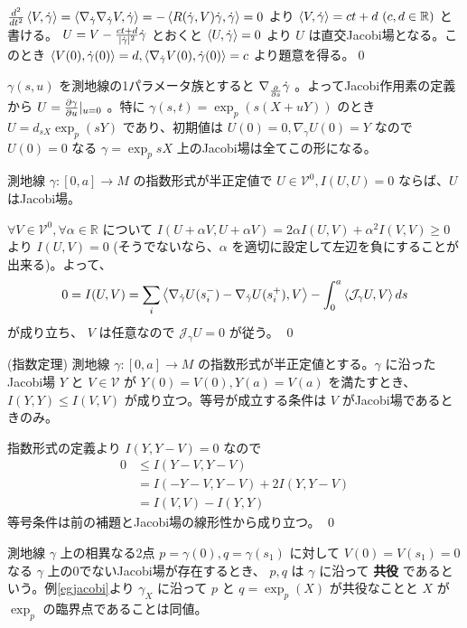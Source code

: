 \documentclass[dvipdfmx,a4paper]{jsreport}
\theoremstyle{definition}
\newcommand{\der}{\partial}
\newcommand{\R}{\mathbb{R}}
\begin{document}
\prf ${d^2 \over dt^2}\ev{V,\dot{\gamma}}=\ev{\nabla_{\dot{\gamma}}\nabla_{\dot{\gamma}}V,\dot{\gamma}}=-\ev{R(\dot{\gamma},V)\dot{\gamma},\dot{\gamma}}=0$ より $\ev{V,\dot{\gamma}}=ct+d\ (c,d \in \R)$ と書ける。 $U=V-{ct+d \over |\dot{\gamma}|^2}\dot{\gamma}$ とおくと $\ev{U,\dot{\gamma}}=0$ より $U$ は直交Jacobi場となる。このとき $\ev{V(0),\dot{\gamma}(0)}=d,\ev{\nabla_{\dot{\gamma}}V(0),\dot{\gamma}(0)}=c$ より題意を得る。\qed


\eg\label{egjacobi} $\gamma(s,u)$ を測地線の1パラメータ族とすると $\nabla_{\der \over \der s} \dot{\gamma}$ 。よってJacobi作用素の定義から $U={\der \gamma \over \der u}|_{u=0}$ 。特に $\gamma(s,t)=\exp_p (s(X+uY))$ のとき $U=d_{sX}\exp_{p}(sY)$ であり、初期値は $U(0)=0,\nabla_{\dot{\gamma}}U(0)=Y$ なので $U(0)=0$ なる $\gamma=\exp_p sX$ 上のJacobi場は全てこの形になる。

\lem\label{lemjacobi} 測地線 $\gamma:[0,a] \to M$ の指数形式が半正定値で $U \in \mathcal{V}^0,I(U,U)=0$ ならば、$U$ はJacobi場。

\prf $\forall V \in \mathcal{V}^0,\forall \alpha \in \mathbb{R}$ について $I(U+\alpha V,U+\alpha V)=2\alpha I(U,V)+\alpha^2I(V,V)\geq 0$ より $I(U,V) =0$ (そうでないなら、$\alpha$ を適切に設定して左辺を負にすることが出来る)。よって、
\begin{align*}
    0=I(U,V)=\sum_i \ev{\nabla_{\dot{\gamma}}U(s_i^-)-\nabla_{\dot{\gamma}}U(s_i^+),V}-\int_0^a \ev{\mathcal{J}_\gamma U,V} ds
\end{align*}
が成り立ち、 $V$ は任意なので $\mathcal{J}_\gamma U=0$ が従う。 \qed

\lem\label{lemindex} (指数定理) 測地線 $\gamma:[0,a] \to M$ の指数形式が半正定値とする。$\gamma$ に沿ったJacobi場 $Y$ と $V \in \mathcal{V}$ が $Y(0)=V(0),Y(a)=V(a)$ を満たすとき、$I(Y,Y) \leq I(V,V)$ が成り立つ。等号が成立する条件は $V$ がJacobi場であるときのみ。

\prf 指数形式の定義より $I(Y,Y-V)=0$ なので
\begin{align*}
    0 &\leq I(Y-V,Y-V) \\
    &=I(-Y-V,Y-V)+2I(Y,Y-V) \\
    &=I(V,V)-I(Y,Y)
\end{align*}
等号条件は前の補題とJacobi場の線形性から成り立つ。 \qed

 測地線 $\gamma$ 上の相異なる2点 $p=\gamma(0),q=\gamma(s_1)$ に対して $V(0)=V(s_1)=0$ なる $\gamma$ 上の0でないJacobi場が存在するとき、 $p,q$ は $\gamma$ に沿って \textbf{共役} であるという。例\ref{egjacobi}より $\gamma_X$ に沿って $p$ と $q=\exp_p(X)$ が共役なことと $X$ が $\exp_p$ の臨界点であることは同値。
\end{document}
